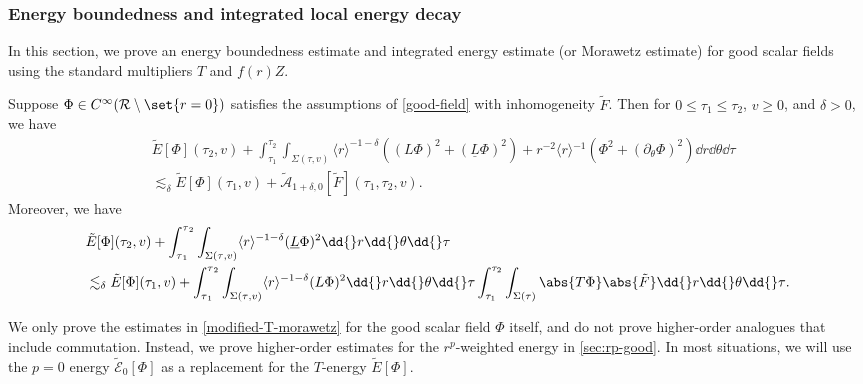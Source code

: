 \documentclass[10pt, reqno]{amsart}
\begin{document}
\subsubsection{Energy boundedness and integrated local energy decay}
\label{good-eb}
In this section, we prove an energy boundedness estimate and integrated energy
estimate (or Morawetz estimate) for good scalar fields using the standard
multipliers \(T\) and \(f(r)Z\).
\begin{proposition}
Suppose \(\Phi{}\in C^\infty(\mathcal{R}\setminus \set{r=0})\) satisfies the assumptions of
\cref{good-field} with inhomogeneity \(\tilde{F}\). Then for \(0\le \tau_1\le \tau_2\), \(v\ge 0\), and \(\delta{} > 0\), we have
\begin{equation}\label{modified-T-equation}
\begin{split}
&\tilde{E}[\Phi{}](\tau_2,v) + \int_{\tau_1}^{\tau_2} \int _{\Sigma{}(\tau{},v)} \langle{}r\rangle^{-1-\delta{}}((L\Phi{})^2 + (\underline{L}\Phi{})^2) + r^{-2}\langle{}r\rangle{}^{-1}(\Phi^2 + (\partial{}_\theta{}\Phi{})^2)\dd{}r\dd{}\theta{}\dd{}\tau{}\\
&\lesssim_{\delta{}} \tilde{E}[\Phi{}](\tau{}_1,v) + \tilde{\mathcal{A}}_{1+\delta{},0}[\tilde{F}](\tau{}_1,\tau{}_2,v).
\end{split}
\end{equation}
Moreover, we have
\begin{equation}\label{modified-T-prep-0}
\begin{split}
&\tilde{E}[\Phi{}](\tau_2,v) + \int_{\tau{}_1}^{\tau{}_2} \int _{\Sigma{}(\tau{},v)} \langle{}r\rangle^{-1-\delta{}}(\underline{L}\Phi{})^2 \dd{}r\dd{}\theta{}\dd{}\tau{} \\
&\lesssim_\delta{}  \tilde{E}[\Phi{}](\tau_1,v) +\int_{\tau{}_1}^{\tau{}_2} \int _{\Sigma{}(\tau{},v)} \langle{}r\rangle^{-1-\delta{}}(L\Phi{})^2 \dd{}r\dd{}\theta{}\dd{}\tau{}  \int_{\tau_1}^{\tau_2} \int _{\Sigma{}(\tau{})} \abs{T\Phi{}}\abs{\tilde{F}}\dd{}r\dd{}\theta{}\dd{}\tau{}.
\end{split}
\end{equation}
\label{modified-T-morawetz}
\end{proposition}
\begin{remark}
We only prove the estimates in \cref{modified-T-morawetz} for the good scalar field
\(\Phi{}\) itself, and do not prove higher-order analogues that include
commutation. Instead, we prove higher-order estimates for the \(r^p\)-weighted
energy in \cref{sec:rp-good}. In most situations, we will use the \(p=0\) energy
\(\tilde{\mathcal{E}}_0[\Phi{}]\) as a replacement for the \(T\)-energy
\(\tilde{E}[\Phi{}]\).
\end{remark}
\end{document}
